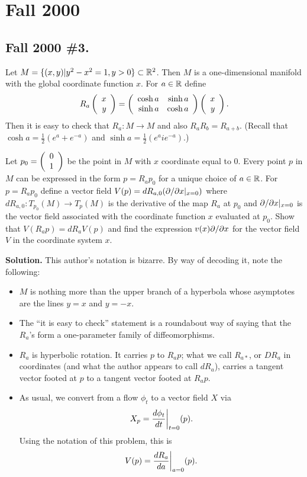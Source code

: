 \documentclass[10pt]{article}
\numberwithin{equation}{subsection}
\begin{document}
\newpage
\section{Fall 2000}

\subsection{Fall 2000 \#3.}

Let $M=\{(x,y)|y^2-x^2=1,y>0\} \subset \mathbb{R}^2$.  Then $M$ is a one-dimensional
manifold with the global coordinate function $x$.  For $a \in \mathbb{R}$ define
$$
	R_a\left(\begin{array}{r} x \\ y \end{array}\right) = \left(\begin{array}{rrrrrrrrrrrr} \cosh a & \sinh a \\ \sinh a & \cosh a \end{array}\right)
	\left(\begin{array}{r} x \\ y \end{array}\right).
$$
Then it is easy to check that $R_a:M \to M$ and also $R_a R_b = R_{a+b}$.
(Recall that $\cosh a = \frac{1}{2}(e^a+e^{-a})$ and $\sinh a =
\frac{1}{2}(e^aie^{-a})$.)

Let $p_0=\left(\begin{array}{r} 0 \\ 1 \end{array}\right)$ be the point in $M$ with $x$ coordinate equal to 0.
Every point $p$ in $M$ can be expressed in the form $p=R_a p_0$ for a unique
choice of $a \in \mathbb{R}$.  For $p=R_a p_0$ define a vector field $V(p) =
dR_{a,0}(\partial/\partial x|_{x=0})$ where $dR_{a,0}:T_{p_0}(M) \to T_p(M)$ is the
derivative of the map $R_a$ at $p_0$ and $\partial/\partial x|_{x=0}$ is the vector field
associated with the coordinate function $x$ evaluated at $p_0$.  Show that
$V(R_a p)=dR_aV(p)$ and find the expression $v(x)\partial/\partial x$ for the vector field
$V$ in the coordinate system $x$.

\textbf{Solution.}  This author's notation is bizarre.  By way of decoding it,
note the following:

\begin{itemize}

\item $M$ is nothing more than the upper branch of a hyperbola whose asymptotes
are the lines $y=x$ and $y=-x$.

\item The ``it is easy to check'' statement is a roundabout way of saying
that the $R_a$'s form a one-parameter family of diffeomorphisms.

\item $R_a$ is hyperbolic rotation.  It carries $p$ to $R_a p$; what we call
$R_{a*}$, or $DR_a$ in coordinates (and what the author appears to call
$dR_a$), carries a tangent vector footed at $p$ to a tangent vector footed at
$R_a p$.

\item As usual, we convert from a flow $\phi_t$ to a vector field $X$ via
$$
	X_p = \frac{d\phi_t}{dt}\bigg|_{\tiny{t=0}}(p).
$$
Using the notation of this problem, this is
$$
	V(p) = \frac{dR_a}{da}\bigg|_{\tiny{a=0}}(p).
$$
\end{itemize}
\end{document}
